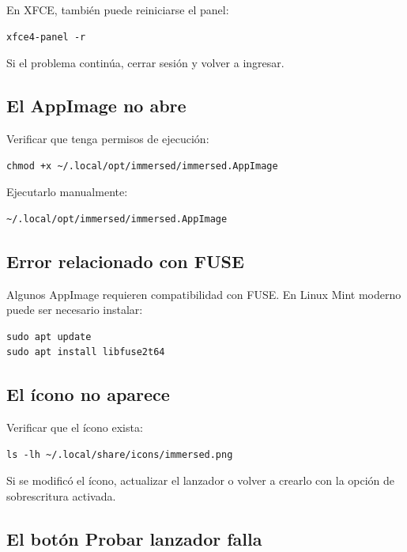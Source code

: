 \documentclass[11pt,a4paper]{article}
\begin{document}
En XFCE, también puede reiniciarse el panel:

\begin{lstlisting}[style=bashstyle]
xfce4-panel -r
\end{lstlisting}

Si el problema continúa, cerrar sesión y volver a ingresar.

\subsection{El AppImage no abre}

Verificar que tenga permisos de ejecución:

\begin{lstlisting}[style=bashstyle]
chmod +x ~/.local/opt/immersed/immersed.AppImage
\end{lstlisting}

Ejecutarlo manualmente:

\begin{lstlisting}[style=bashstyle]
~/.local/opt/immersed/immersed.AppImage
\end{lstlisting}

\subsection{Error relacionado con FUSE}

Algunos AppImage requieren compatibilidad con FUSE. En Linux Mint moderno puede ser necesario instalar:

\begin{lstlisting}[style=bashstyle]
sudo apt update
sudo apt install libfuse2t64
\end{lstlisting}

\subsection{El ícono no aparece}

Verificar que el ícono exista:

\begin{lstlisting}[style=bashstyle]
ls -lh ~/.local/share/icons/immersed.png
\end{lstlisting}

Si se modificó el ícono, actualizar el lanzador o volver a crearlo con la opción de sobrescritura activada.

\subsection{El botón Probar lanzador falla}
\end{document}
